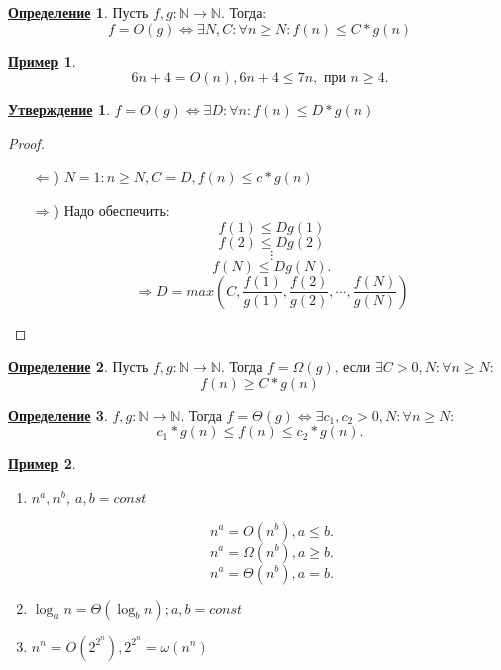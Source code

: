 \documentclass[12pt]{article}
\newcommand{\N}{\mathbb{N}}
\newtheorem{statement}{\underline{Утверждение}}[section]
\newtheorem*{example}{\underline{Пример}}
\theoremstyle{definition}
\newtheorem{definition}{\underline{Определение}}[section]
\theoremstyle{definition}
\begin{document}
\begin{definition}
Пусть $f, g: \N \rightarrow \N$. Тогда:
\[
    f = O(g) \iff \exists N, C \colon \forall n \geq N \colon f(n) \leq C * g(n)
\]
\begin{example}
\[
6n + 4 = O(n), 6n + 4 \leq 7n, \text{ при } n \geq 4
.\] 
\end{example}

\end{definition}

\begin{statement}
$f = O(g) \iff \exists D \colon \forall n \colon f(n) \leq D * g(n)$
\end{statement}
\begin{proof}
    ~\newline
\begin{itemize}
    \item [$\Leftarrow$)] $N = 1 \colon n \geq N, C = D, f(n) \leq c * g(n)$
    \item [$\Rightarrow$)] Надо обеспечить:
        \[
        f(1) \leq D g(1)
        \] 
        \[
        f(2) \leq D g(2)
        \] 
        \[
            \vdots
        \]
         \[
        f(N) \leq D g(N)
        .\] 
        \[
            \Rightarrow D = max(C, \frac{f(1)}{g(1)}, \frac{f(2)}{g(2)}, \cdots, \frac{f(N)}{g(N)})
        \]
\end{itemize}
\end{proof}

\begin{definition}
Пусть $f, g: \N \rightarrow \N$. Тогда $f = \Omega(g) \text{, если } \exists C > 0, N \colon \forall n \geq N$: 
\[
f(n) \geq C * g(n)
\] 
\end{definition}
\begin{definition}
$f, g: \N \rightarrow \N$. Тогда $f = \Theta(g) \iff \exists c_1, c_2 > 0, N \colon \forall n \geq N$:
\[
c_1 * g(n) \leq f(n) \leq c_2 * g(n)
.\] 
\end{definition}
\begin{example}
\begin{enumerate}
    \item $n^{a}, n^{b}$, $a, b = const$ 

        \[
        n^{a} = O(n^{b}), a \leq b
        .\] 
        \[
        n^{a} = \Omega(n^{b}), a \geq b
        .\] 
        \[
        n^{a} = \Theta(n^{b}), a = b
        .\] 
    \item $\log_{a}{n} = \Theta(\log_{b}{n}); a, b = const$ 
    \item $n^{n} = O(2^{2^{n}}), 2^{2^{n}} = \omega(n^{n})$
\end{enumerate}
\end{example}
\end{document}
